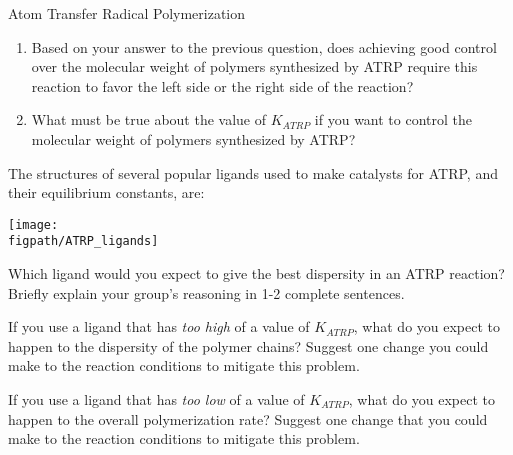 \begin{activity}{Atom Transfer Radical Polymerization}
\begin{ctqs}
		\begin{enumerate}
			\item Based on your answer to the previous question, does achieving good control over the molecular weight of polymers synthesized by ATRP require this reaction to favor the left side or the right side of the reaction?
			
				\begin{solution}[1in]
				\end{solution}
			
			\item What must be true about the value of $K_{ATRP}$ if you want to control the molecular weight of polymers synthesized by ATRP?
			
				\begin{solution}[1in]
				\end{solution}
			
		\end{enumerate}

\end{ctqs}

\begin{infobox}
	The structures of several popular ligands used to make catalysts for ATRP, and their equilibrium constants, are:
	
	\centerline{\texttt{[image: \\figpath/ATRP\_ligands]}}
\end{infobox}

\begin{ctqs}
	
	\question Which ligand would you expect to give the best dispersity in an ATRP reaction?  Briefly explain your group's reasoning in 1-2 complete sentences.
	
		\begin{solution}[1.25in]
		\end{solution}
	
	\question If you use a ligand that has \emph{too high} of a value of $K_{ATRP}$, what do you expect to happen to the dispersity of the polymer chains?  Suggest one change you could make to the reaction conditions to mitigate this problem.
	
		\begin{solution}[1.25in]
		\end{solution}
	
	\question If you use a ligand that has \emph{too low} of a value of $K_{ATRP}$, what do you expect to happen to the overall polymerization rate?  Suggest one change that you could make to the reaction conditions to mitigate this problem.
	

\end{ctqs}
\end{activity}
